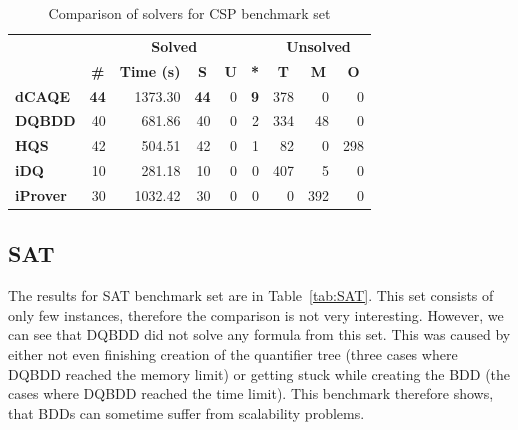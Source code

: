 \documentclass[
  digital, %
  color,
  twoside, %
  table,   %
  nolof,     %
  nolot,     %
]{fithesis3}
\theoremstyle{definition}
\theoremstyle{remark}
\begin{document}
\begin{table}[ht]
\centering
\caption{Comparison of solvers for CSP benchmark set}%
\label{tab:CSP}
\begin{tabular}{|l|r|r|r|r|r|r|r|r|}
\hline
\multicolumn{1}{|c|}{}                                  & \multicolumn{5}{c|}{\textbf{Solved}}                                                                                                                                        & \multicolumn{3}{c|}{\textbf{Unsolved}}                                                                 \\  \hhline{~*{8}{-}}
\multicolumn{1}{|c|}{\multirow{-2}{*}{\textbf{Solver}}} & \multicolumn{1}{c|}{\textbf{\#}} & \multicolumn{1}{c|}{\textbf{Time (s)}} & \multicolumn{1}{c|}{\textbf{S}} & \multicolumn{1}{c|}{\textbf{U}} & \multicolumn{1}{c|}{\textbf{*}} & \multicolumn{1}{c|}{\textbf{T}} & \multicolumn{1}{c|}{\textbf{M}} & \multicolumn{1}{c|}{\textbf{O}} \\ \hline
\textbf{dCAQE} & \phantom{0}\textbf{44} & \num{1373.30} & \phantom{0}\textbf{44} & \phantom{00}\num{0} & \phantom{00}\textbf{9} & \num{378} & \num{0} & \num{0} \\ \hline
\textbf{DQBDD} & \num{40} & \num{681.86} & \num{40} & \num{0} & \num{2} & \num{334} & \num{48} & \num{0} \\ \hline
\textbf{HQS} & \num{42} & \num{504.51} & \num{42} & \num{0} & \num{1} & \num{82} & \num{0} & \num{298} \\ \hline
\textbf{iDQ} & \num{10} & \num{281.18} & \num{10} & \num{0} & \num{0} & \num{407} & \num{5} & \num{0} \\ \hline
\textbf{iProver} & \num{30} & \num{1032.42} & \num{30} & \num{0} & \num{0} & \num{0} & \num{392} & \num{0} \\ \hline
\end{tabular}
\end{table}


\subsection{SAT}
The results for SAT benchmark set are in Table~\ref{tab:SAT}. This set consists of only few instances, therefore the comparison is not very interesting. However, we can see that DQBDD did not solve any formula from this set. This was caused by either not even finishing creation of the quantifier tree (three cases where DQBDD reached the memory limit) or getting stuck while creating the BDD (the cases where DQBDD reached the time limit). This benchmark therefore shows, that BDDs can sometime suffer from scalability problems.
\end{document}
